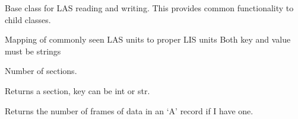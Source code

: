 \documentclass[letterpaper,10pt,english]{sphinxmanual}
\begin{document}
\begin{fulllineitems}
\label{\detokenize{ref/LAS/core/LASRead:TotalDepth.LAS.core.LASRead.LASBase}}
Base class for LAS reading and writing. This provides common functionality to child classes.

\begin{fulllineitems}
\label{\detokenize{ref/LAS/core/LASRead:TotalDepth.LAS.core.LASRead.LASBase.UNITS_LAS_TO_LIS}}
Mapping of commonly seen LAS units to proper LIS units
Both key and value must be strings

\end{fulllineitems}


\begin{fulllineitems}
\label{\detokenize{ref/LAS/core/LASRead:TotalDepth.LAS.core.LASRead.LASBase.__len__}}
Number of sections.

\end{fulllineitems}


\begin{fulllineitems}
\label{\detokenize{ref/LAS/core/LASRead:TotalDepth.LAS.core.LASRead.LASBase.__getitem__}}
Returns a section, key can be int or str.

\end{fulllineitems}


\begin{fulllineitems}
\label{\detokenize{ref/LAS/core/LASRead:TotalDepth.LAS.core.LASRead.LASBase.numFrames}}
Returns the number of frames of data in an ‘A’ record if I have one.

\end{fulllineitems}



\end{fulllineitems}
\end{document}
